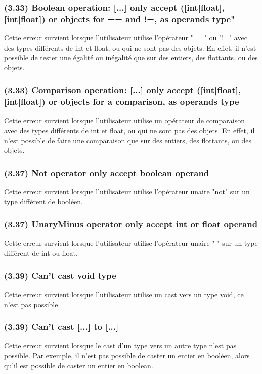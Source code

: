 \documentclass[12pt, a4paper, one side]{article}
\begin{document}
\subsubsection{(3.33) Boolean operation: [...] only accept ([int|float], [int|float]) or objects for == and !=, as operands type"}
Cette erreur survient lorsque l'utilisateur utilise l'opérateur "==" ou "!=" avec des types différents de int et float, ou qui ne sont pas des objets. En effet, il n'est possible de tester une égalité ou inégalité que sur des entiers, des flottants, ou des objets.

\subsubsection{(3.33) Comparison operation: [...] only accept ([int|float], [int|float]) or objects for a comparison, as operands type}
Cette erreur survient lorsque l'utilisateur utilise un opérateur de comparaison avec des types différents de int et float, ou qui ne sont pas des objets. En effet, il n'est possible de faire une comparaison que sur des entiers, des flottants, ou des objets.

\subsubsection{(3.37) Not operator only accept boolean operand}
Cette erreur survient lorsque l'utilisateur utilise l'opérateur unaire "not" sur un type différent de booléen.

\subsubsection{(3.37) UnaryMinus operator only accept int or float operand}
Cette erreur survient lorsque l'utilisateur utilise l'opérateur unaire "-" sur un type différent de int ou float.

\subsubsection{(3.39) Can't cast void type}
Cette erreur survient lorsque l'utilisateur utilise un cast vers un type void, ce n'est pas possible.

\subsubsection{(3.39) Can't cast [...] to [...]}
Cette erreur survient lorsque le cast d'un type vers un autre type n'est pas possible. Par exemple, il n'est pas possible de caster un entier en booléen, alors qu'il est possible de caster un entier en boolean.
\end{document}
